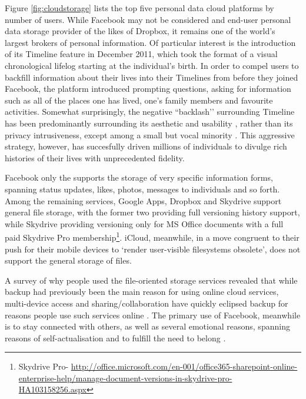 \documentclass[graybox]{svmult}
\begin{document}
Figure \ref{fig:cloudstorage} lists the top five personal data cloud platforms by number of users. While Facebook may not be considered and end-user personal data storage provider of the likes of Dropbox, it remains one of the world's largest brokers of personal information.  Of particular interest is the introduction of its Timeline feature in December 2011, which took the format of a visual chronological lifelog starting at the individual’s birth.  In order to compel users to backfill information about their lives into their Timelines from before they joined Facebook, the platform introduced prompting questions, asking for information such as all of the places one has lived, one’s family members and favourite activities.  Somewhat surprisingly, the negative ``backlash’’  surrounding Timeline has been predominantly surrounding its aesthetic and usability \cite{mashable-timeline}, rather than its privacy intrusiveness, except among a small but vocal minority \cite{sophos-timeline}. This aggressive strategy, however, has succesfully driven millions of individuals to divulge rich histories of their lives with unprecedented fidelity.

Facebook only the supports the storage of very specific information forms, spanning status updates, likes, photos, messages to individuals and so forth.  Among the remaining services, Google Apps, Dropbox and Skydrive support general file storage, with the former two providing full versioning history support, while Skydrive providing versioning only for MS Office documents with a full paid Skydrive Pro membership\footnote{Skydrive Pro- \url{http://office.microsoft.com/en-001/office365-sharepoint-online-enterprise-help/manage-document-versions-in-skydrive-pro-HA103158256.aspx}}.  iCloud, meanwhile, in a move congruent to their push for their mobile devices to ‘render user-visible filesystems obsolete’,  does not support the general storage of files.  

A survey of why people used the file-oriented storage services revealed that while backup had previously been the main reason for using online cloud services, multi-device access and sharing/collaboration have quickly eclipsed backup for reasons people use such services online \cite{van2009note}. The primary use of Facebook, meanwhile is to stay connected with others, as well as several emotional reasons, spanning reasons of self-actualisation and to fulfill the need to belong \cite{nadkarni2012people}.
\end{document}
